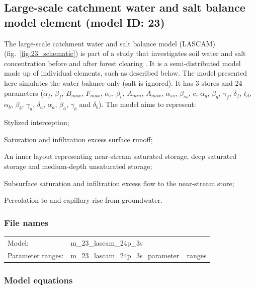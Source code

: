 \subsection{Large-scale catchment water and salt balance model element (model ID: 23)}
The large-scale catchment water and salt balance model (LASCAM) (fig.~\ref{fig:23_schematic}) is part of a study that investigates soil water and salt concentration before and after forest clearing \citep{Sivapalan1996a}. It is a semi-distributed model made up of individual elements, such as described below. The model presented here simulates the water balance only (salt is ignored). It has 3 stores and 24 parameters ($\alpha_f$, $\beta_f$, $B_{max}$,  $F_{max}$, $\alpha_c$, $\beta_c$, $A_{min}$, $A_{max}$, $\alpha_{ss}$, $\beta_{ss}$, $c$, $\alpha_g$, $\beta_g$, $\gamma_f$, $\delta_f$, $t_d$, $\alpha_b$, $\beta_b$, $\gamma_a$, $\delta_a$, $\alpha_a$, $\beta_a$, $\gamma_b$ and $\delta_b$). The model aims to represent:

\begin{itemizecompact}
\item Stylized interception;
\item Saturation and infiltration excess surface runoff;
\item An inner layout representing near-stream saturated storage, deep saturated storage and medium-depth unsaturated storage;
\item Subsurface saturation and infiltration excess flow to the near-stream store;
\item Percolation to and capillary rise from groundwater.
\end{itemizecompact}

\subsubsection{File names}
\begin{tabular}{@{}ll}
Model: &m\_23\_lascam\_24p\_3s \\
Parameter ranges: &m\_23\_lascam\_24p\_3s\_parameter\_ ranges \\
\end{tabular}

\subsubsection{Model equations}

